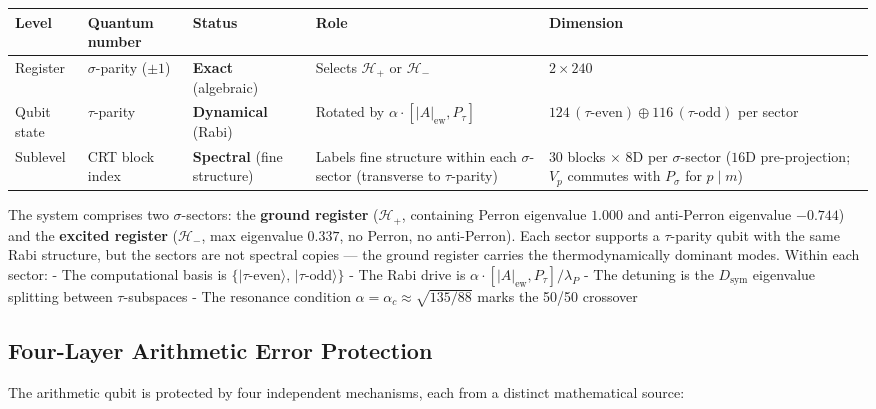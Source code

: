 \documentclass[11pt,letterpaper]{article}
\theoremstyle{definition}
\theoremstyle{remark}
\begin{document}
\begin{longtable}[]{@{}
  >{\raggedright\arraybackslash}p{}
  >{\raggedright\arraybackslash}p{}
  >{\raggedright\arraybackslash}p{}
  >{\raggedright\arraybackslash}p{}
  >{\raggedright\arraybackslash}p{}@{}}
\toprule
Level & Quantum number & Status & Role & Dimension \\
\midrule
\endhead
\bottomrule
Register & $\sigma$-parity ($\pm 1$) & \textbf{Exact} (algebraic) & Selects $\mathcal{H}_+$ or $\mathcal{H}_-$ & $2 \times 240$ \\
Qubit state & $\tau$-parity & \textbf{Dynamical} (Rabi) & Rotated by $\alpha \cdot [|A|_{\text{ew}}, P_\tau]$ & $124\,(\tau\text{-even}) \oplus 116\,(\tau\text{-odd})$ per sector \\
Sublevel & CRT block index & \textbf{Spectral} (fine structure) & Labels fine structure within each $\sigma$-sector (transverse to $\tau$-parity) & $30$ blocks $\times$ $8$D per $\sigma$-sector ($16$D pre-projection; $V_p$ commutes with $P_\sigma$ for $p \mid m$) \\
\end{longtable}

The system comprises two $\sigma$-sectors: the \textbf{ground register} ($\mathcal{H}_+$, containing Perron eigenvalue $1.000$ and anti-Perron eigenvalue $-0.744$) and the \textbf{excited register} ($\mathcal{H}_-$, max eigenvalue $0.337$, no Perron, no anti-Perron). Each sector supports a $\tau$-parity qubit with the same Rabi structure, but the sectors are not spectral copies --- the ground register carries the thermodynamically dominant modes. Within each sector: - The computational basis is $\{|\tau\text{-even}\rangle,\, |\tau\text{-odd}\rangle\}$ - The Rabi drive is $\alpha \cdot [|A|_{\text{ew}}, P_\tau] / \lambda_P$ - The detuning is the $D_{\text{sym}}$ eigenvalue splitting between $\tau$-subspaces - The resonance condition $\alpha = \alpha_c \approx \sqrt{135/88}$ marks the 50/50 crossover

\subsection{Four-Layer Arithmetic Error Protection}\label{four-layer-arithmetic-error-protection}

The arithmetic qubit is protected by four independent mechanisms, each from a distinct mathematical source:
\end{document}
